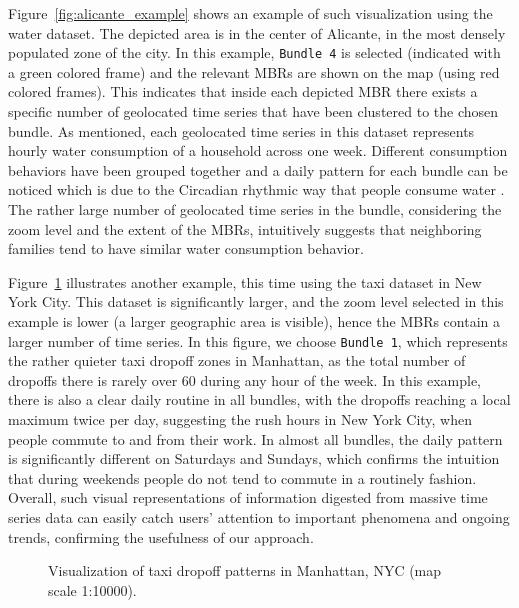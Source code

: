 Figure~\ref{fig:alicante_example} shows an example of such visualization using the water dataset. The depicted area is in the center of Alicante, in the most densely populated zone of the city. In this example, \texttt{Bundle 4} is selected (indicated with a green colored frame) and the relevant MBRs are shown on the map (using red colored frames). This indicates that inside each depicted MBR there exists a specific number of geolocated time series that have been clustered to the chosen bundle. As mentioned, each geolocated time series in this dataset represents hourly water consumption of a household across one week. Different consumption behaviors have been grouped together and a daily pattern for each bundle can be noticed which is due to the Circadian rhythmic way that people consume water \cite{aschoff1965circadian}. The rather large number of geolocated time series in the bundle, considering the zoom level and the extent of the MBRs, intuitively suggests that neighboring families tend to have similar water consumption behavior. 


Figure~\ref{fig:nyc_example} illustrates another example, this time using the taxi dataset in New York City. This dataset is significantly larger, and the zoom level selected in this example is lower (a larger geographic area is visible), hence the MBRs contain a larger number of time series. In this figure, we choose \texttt{Bundle 1}, which represents the rather quieter taxi dropoff zones in Manhattan, as the total number of dropoffs there is rarely over 60 during any hour of the week. In this example, there is also a clear daily routine in all bundles, with the dropoffs reaching a local maximum twice per day, suggesting the rush hours in New York City, when people commute to and from their work. In almost all bundles, the daily pattern is significantly different on Saturdays and Sundays, which confirms the intuition that during weekends people do not tend to commute in a routinely fashion. Overall, such visual representations of information digested from massive time series data can easily catch users' attention to important phenomena and ongoing trends, confirming the usefulness of our approach.

\begin{figure}[ht]
 \centering
 \vspace{-7pt}
 \caption{Visualization of taxi dropoff patterns in Manhattan, NYC (map scale 1:10000).}
 \label{fig:nyc_example}
\end{figure}


